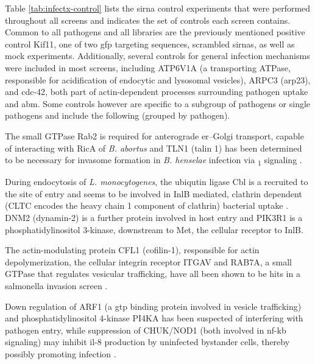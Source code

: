 Table \ref{tab:infectx-control} lists the \gls{sirna} control experiments that were performed throughout all screens and indicates the set of controls each screen contains. Common to all pathogens and all libraries are the previously mentioned positive control Kif11, one of two \gls{gfp} targeting sequences, scrambled \glspl{sirna}, as well as mock experiments. Additionally, several controls for general infection mechanisms were included in most screens, including ATP6V1A (a  transporting ATPase, responsible for acidification of endocytic and lysosomal vesicles), ARPC3 (\acrshort{arp23}), and \gls{cdc-42}, both part of actin-dependent processes surrounding pathogen uptake and \gls{abm}. Some controls however are specific to a subgroup of pathogens or single pathogens and include the following (grouped by pathogen).
\begin{description}[leftmargin=0.5cm]
\item[\textit{Bartonella}\slash \textit{Brucella}:] The small GTPase Rab2 is required for anterograde \gls{er}--Golgi transport, capable of interacting with RicA of \textit{B. abortus} \citep{DeBarsy2011} and TLN1 (talin 1) has been determined to be necessary for invasome formation in \textit{B. henselae} infection via \textbeta\textsubscript{1} signaling \citep{Truttmann2011}.
\item[\textit{Listeria}:] During endocytosis of \textit{L. monocytogenes}, the ubiqutin ligase Cbl is a recruited to the site of entry and seems to be involved in InlB mediated, clathrin dependent (CLTC encodes the heavy chain 1 component of clathrin) bacterial uptake \citep{Veiga2005}. DNM2 (dynamin-2) is a further protein involved in host entry and PIK3R1 is a phosphatidylinositol 3-kinase, downstream to Met, the cellular receptor to InlB.
\item[\textit{Salmonella}:] The actin-modulating protein CFL1 (cofilin-1), responsible for actin depolymerization, the cellular integrin receptor ITGAV and RAB7A, a small GTPase that regulates vesicular trafficking, have all been shown to be hits in a salmonella invasion screen \citep{Misselwitz2011}.
\item[\textit{Shigella}:] Down regulation of ARF1 (a \gls{gtp} binding protein involved in vesicle trafficking) and phosphatidylinositol 4-kinase PI4KA has been suspected of interfering with pathogen entry, while suppression of CHUK\slash NOD1 (both involved in \gls{nf-kb} signaling) may inhibit \gls{il-8} production by uninfected bystander cells, thereby possibly promoting infection \citep{Kasper2012}. 

\end{description}
